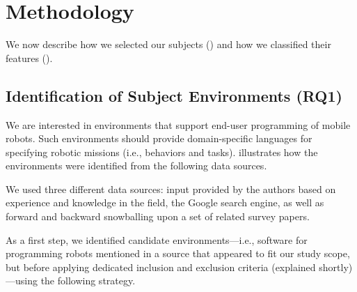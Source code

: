 \section{Methodology}
We now describe how we selected our subjects () and how we classified their features ().
 
\subsection{Identification of Subject Environments (RQ1)}
\label{sec:sel}
We are interested in environments that support end-user programming of mobile robots. Such environments should provide domain-specific languages for specifying robotic missions (i.e., behaviors and tasks). %
 illustrates how the environments were identified from the following data sources.

We used three different data sources: input provided by the authors based on experience and knowledge in the field, the Google search engine, as well as forward and backward snowballing upon a set of related survey papers.


As a first step, we identified candidate environments---i.e., software for programming robots mentioned in a source that appeared to fit our study scope, but before applying dedicated inclusion and exclusion criteria (explained shortly)---using the following strategy.

